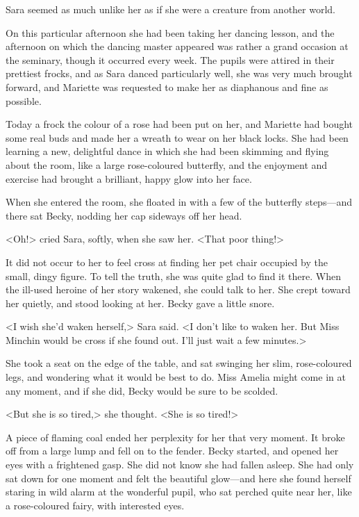 Sara seemed as much unlike her as if she were a creature from another world.

On this particular afternoon she had been taking her dancing lesson, and the afternoon on which the dancing master appeared was rather a grand occasion at the seminary, though it occurred every week. The pupils were attired in their prettiest frocks, and as Sara danced particularly well, she was very much brought forward, and Mariette was requested to make her as diaphanous and fine as possible.

Today a frock the colour of a rose had been put on her, and Mariette had bought some real buds and made her a wreath to wear on her black locks. She had been learning a new, delightful dance in which she had been skimming and flying about the room, like a large rose-coloured butterfly, and the enjoyment and exercise had brought a brilliant, happy glow into her face.

When she entered the room, she floated in with a few of the butterfly steps—and there sat Becky, nodding her cap sideways off her head.

<Oh!> cried Sara, softly, when she saw her. <That poor thing!>

It did not occur to her to feel cross at finding her pet chair occupied by the small, dingy figure. To tell the truth, she was quite glad to find it there. When the ill-used heroine of her story wakened, she could talk to her. She crept toward her quietly, and stood looking at her. Becky gave a little snore.

<I wish she'd waken herself,> Sara said. <I don't like to waken her. But Miss Minchin would be cross if she found out. I'll just wait a few minutes.>

She took a seat on the edge of the table, and sat swinging her slim, rose-coloured legs, and wondering what it would be best to do. Miss Amelia might come in at any moment, and if she did, Becky would be sure to be scolded.

<But she is so tired,> she thought. <She is so tired!>

A piece of flaming coal ended her perplexity for her that very moment. It broke off from a large lump and fell on to the fender. Becky started, and opened her eyes with a frightened gasp. She did not know she had fallen asleep. She had only sat down for one moment and felt the beautiful glow—and here she found herself staring in wild alarm at the wonderful pupil, who sat perched quite near her, like a rose-coloured fairy, with interested eyes.

